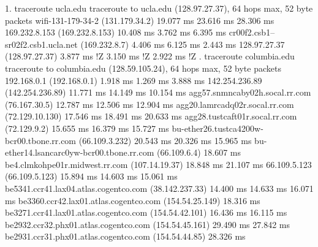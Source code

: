 \documentclass{report}
\begin{document}
\begin{problem}
    \begin{answer}{45em}
    1. traceroute ucla.edu \newline
traceroute to ucla.edu (128.97.27.37), 64 hops max, 52 byte packets  wifi-131-179-34-2 (131.179.34.2)  19.077 ms  23.616 ms  28.306 ms  169.232.8.153 (169.232.8.153)  10.408 ms  3.762 ms  6.395 ms  cr00f2.csb1--sr02f2.csb1.ucla.net (169.232.8.7)  4.406 ms  6.125 ms  2.443 ms  128.97.27.37 (128.97.27.37)  3.877 ms !Z  3.150 ms !Z  2.922 ms !Z
\newline
{}. traceroute columbia.edu\newline
traceroute to columbia.edu (128.59.105.24), 64 hops max, 52 byte packets  192.168.0.1 (192.168.0.1)  1.918 ms  1.269 ms  3.888 ms  142.254.236.89 (142.254.236.89)  11.771 ms  14.149 ms  10.154 ms  agg57.snmncaby02h.socal.rr.com (76.167.30.5)  12.787 ms  12.506 ms  12.904 ms  agg20.lamrcadq02r.socal.rr.com (72.129.10.130)  17.546 ms  18.491 ms  20.633 ms  agg28.tustcaft01r.socal.rr.com (72.129.9.2)  15.655 ms  16.379 ms  15.727 ms  bu-ether26.tustca4200w-bcr00.tbone.rr.com (66.109.3.232)  20.543 ms  20.326 ms  15.965 ms  bu-ether14.lsancarc0yw-bcr00.tbone.rr.com (66.109.6.4)  18.607 ms
    be4.clmkohpe01r.midwest.rr.com (107.14.19.37)  18.848 ms  21.107 ms  66.109.5.123 (66.109.5.123)  15.894 ms  14.603 ms  15.061 ms  be5341.ccr41.lax04.atlas.cogentco.com (38.142.237.33)  14.400 ms  14.633 ms  16.071 ms  be3360.ccr42.lax01.atlas.cogentco.com (154.54.25.149)  18.316 ms\newline
    be3271.ccr41.lax01.atlas.cogentco.com (154.54.42.101)  16.436 ms  16.115 ms  be2932.ccr32.phx01.atlas.cogentco.com (154.54.45.161)  29.490 ms  27.842 ms\newline
    be2931.ccr31.phx01.atlas.cogentco.com (154.54.44.85)  28.326 ms\newline

\end{answer}
\end{problem}
\end{document}
